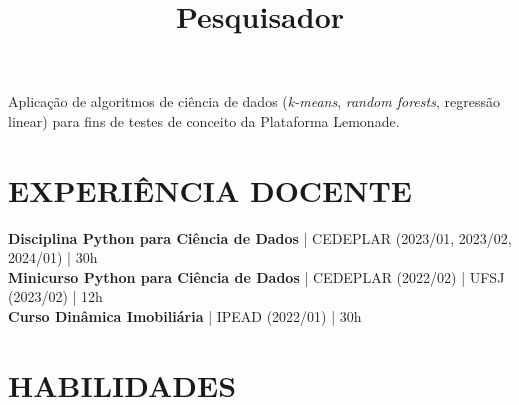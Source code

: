\documentclass[margin]{res}
\begin{document}
\begin{resume}
\title{\textbf{Pesquisador}}
\begin{position}
Aplicação de algoritmos de ciência de dados (\textit{k-means}, \textit{random forests}, regressão linear) para fins de testes de conceito da Plataforma Lemonade.
\end{position}



\section{EXPERIÊNCIA DOCENTE}

\textbf{Disciplina  Python para Ciência de Dados} | CEDEPLAR  (2023/01, 2023/02, 2024/01) | 30h \\
\textbf{Minicurso Python para Ciência de Dados} | CEDEPLAR (2022/02) | UFSJ (2023/02)  | 12h \\
\textbf{Curso Dinâmica Imobiliária} | IPEAD (2022/01) | 30h \\

\section{HABILIDADES}


\end{resume}
\end{document}
